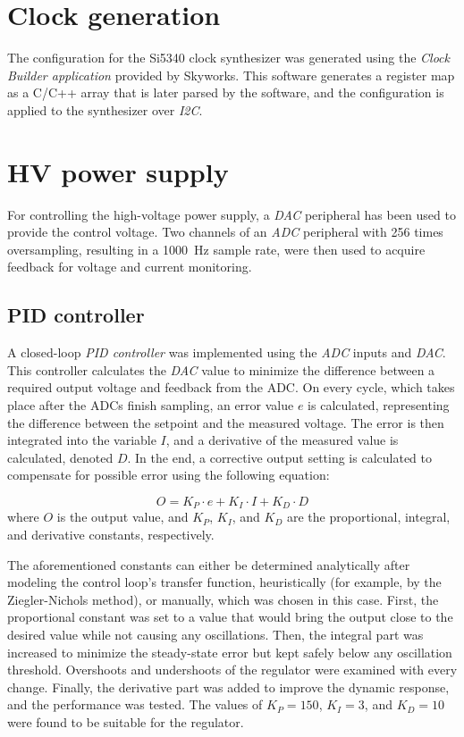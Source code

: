 \section{Clock generation}
The configuration for the Si5340 clock synthesizer was generated using the \emph{Clock Builder application} provided by Skyworks. This software generates a register map as a C/C++ array that is later parsed by the software, and the configuration is applied to the synthesizer over \emph{I2C}.

\section{HV power supply}
For controlling the high-voltage power supply, a \emph{DAC} peripheral has been used to provide the control voltage. Two channels of an \emph{ADC} peripheral with 256 times oversampling, resulting in a \SI{1000}{\hertz} sample rate, were then used to acquire feedback for voltage and current monitoring. 

\subsection{PID controller}
A closed-loop \emph{PID controller} was implemented using the \emph{ADC} inputs and \emph{DAC}. This controller calculates the \emph{DAC} value to minimize the difference between a required output voltage and feedback from the ADC. On every cycle, which takes place after the ADCs finish sampling, an error value $e$ is calculated, representing the difference between the setpoint and the measured voltage. The error is then integrated into the variable $I$, and a derivative of the measured value is calculated, denoted $D$. In the end, a corrective output setting is calculated to compensate for possible error using the following equation:

\begin{equation}
    O = K_P \cdot e + K_I \cdot I + K_D \cdot D
\end{equation}
where $O$ is the output value, and $K_P$, $K_I$, and $K_D$ are the proportional, integral, and derivative constants, respectively.

The aforementioned constants can either be determined analytically after modeling the control loop's transfer function, heuristically (for example, by the Ziegler-Nichols method), or manually, which was chosen in this case. First, the proportional constant was set to a value that would bring the output close to the desired value while not causing any oscillations. Then, the integral part was increased to minimize the steady-state error but kept safely below any oscillation threshold. Overshoots and undershoots of the regulator were examined with every change. Finally, the derivative part was added to improve the dynamic response, and the performance was tested. The values of $K_P = 150$, $K_I = 3$, and $K_D = 10$ were found to be suitable for the regulator.
